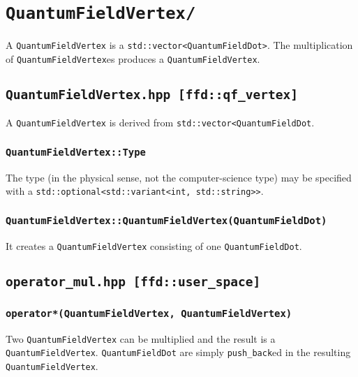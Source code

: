 \chapter{\texttt{QuantumFieldVertex/}}
A \texttt{QuantumFieldVertex} is a \texttt{std::vector<QuantumFieldDot>}. The multiplication of \texttt{QuantumFieldVertex}es produces a \texttt{QuantumFieldVertex}.
\section{\texttt{QuantumFieldVertex.hpp [ffd::qf\_vertex]}}
A \texttt{QuantumFieldVertex} is derived from \texttt{std::vector<QuantumFieldDot}.
\subsection{\texttt{QuantumFieldVertex::Type}}
The type (in the physical sense, not the computer-science type) may be specified with a \texttt{std::optional<std::variant<int, std::string>>}.
\subsection{\texttt{QuantumFieldVertex::QuantumFieldVertex(QuantumFieldDot)}}
It creates a \texttt{QuantumFieldVertex} consisting of one \texttt{QuantumFieldDot}.
\section{\texttt{operator\_mul.hpp [ffd::user\_space]}}
\subsection{\texttt{operator*(QuantumFieldVertex, QuantumFieldVertex) }}
Two \texttt{QuantumFieldVertex} can be multiplied and the result is a \texttt{QuantumFieldVertex}. \texttt{QuantumFieldDot} are simply \texttt{push\_back}ed in the resulting \texttt{QuantumFieldVertex}.
